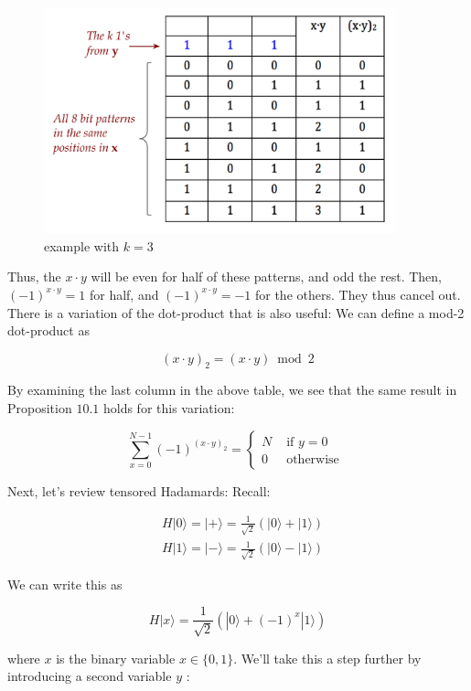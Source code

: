\documentclass[main.tex]{subfiles}
\begin{document}
    \begin{figure}
        \centering
        \includegraphics[width=4in]{notes/figs/n11/14binaryvec2.png}
            \caption{example with $k=3$}
        \label{fig:14binaryvec2}
    \end{figure}
    
    Thus, the $x \cdot y$ will be even for half of these patterns, and odd the rest. Then, $(-1)^{x \cdot y}=1$ for half, and $(-1)^{x \cdot y}=-1$ for the others. They thus cancel out. There is a variation of the dot-product that is also useful: We can define a mod-2 dot-product as
    
    $$
    (x \cdot y)_{2}=(x \cdot y) \bmod 2
    $$
    
    By examining the last column in the above table, we see that the same result in Proposition $10.1$ holds for this variation:
    
    $$
    \sum_{x=0}^{N-1}(-1)^{(x \cdot y)_{2}}=\left\{\begin{array}{cc}
    N & \text { if } y=0 \\
    0 & \text { otherwise }
    \end{array}\right.
    $$
    
    Next, let's review tensored Hadamards: Recall:
    
    $$
    \begin{aligned}
    &H|0\rangle=|+\rangle=\frac{1}{\sqrt{2}}(|0\rangle+|1\rangle) \\
    &H|1\rangle=|-\rangle=\frac{1}{\sqrt{2}}(|0\rangle-|1\rangle)
    \end{aligned}
    $$
    
    We can write this as
    
    $$
    H|x\rangle=\frac{1}{\sqrt{2}}\left(|0\rangle+(-1)^{x}|1\rangle\right)
    $$
    
    where $x$ is the binary variable $x \in\{0,1\}$. We'll take this a step further by introducing a second variable $y$ :
    
\end{document}
